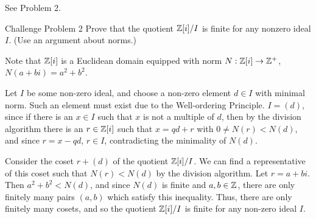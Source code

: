 \documentclass{hmwk}
\begin{document}
\begin{solution}

\pre See Problem 2.
\end{solution}

\begin{problem}{Challenge Problem 2}
Prove that the quotient $\mathbb{Z}[i]/I$ is finite for any nonzero ideal $I$. (Use an argument about norms.)
\end{problem}

\begin{solution}

\pre Note that $\mathbb{Z}[i]$ is a Euclidean domain equipped with norm $N: \mathbb{Z}[i] \rightarrow \mathbb{Z}^+$, $N(a + bi) = a^2 + b^2$.

\pre Let $I$ be some non-zero ideal, and choose a non-zero element $d \in I$ with minimal norm. Such an element must exist due to the Well-ordering Principle. $I = (d)$, since if there is an $x \in I$ such that $x$ is not a multiple of $d$, then by the division algorithm there is an $r \in \mathbb{Z}[i]$ such that $x = qd + r$ with $0 \neq N(r) < N(d)$, and since $r = x - qd$, $r \in I$, contradicting the minimality of $N(d)$. 

\pre Consider the coset $r + (d)$ of the quotient $\mathbb{Z}[i]/I$. We can find a representative of this coset such that $N(r) < N(d)$ by the division algorithm. Let $r = a + bi$. Then $a^2 + b^2 < N(d)$, and since $N(d)$ is finite and $a, b \in \mathbb{Z}$, there are only finitely many pairs $(a, b)$ which satisfy this inequality. Thus, there are only finitely many cosets, and so the quotient $\mathbb{Z}[i]/I$ is finite for any non-zero ideal $I$.
\end{solution}
\end{document}
